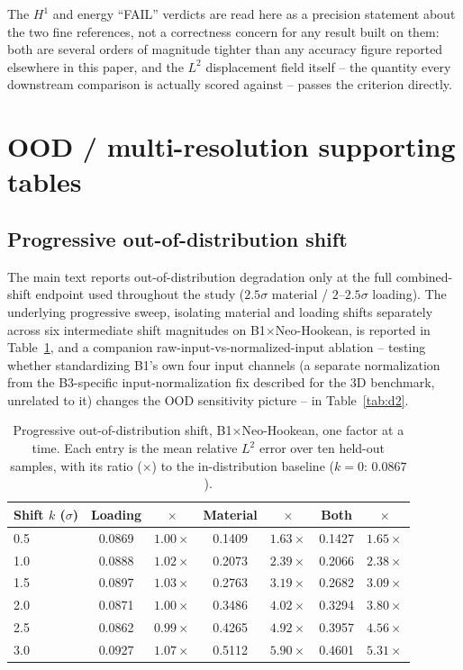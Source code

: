 \documentclass[final,5p,times]{elsarticle}
\begin{document}
The $H^1$ and energy ``FAIL'' verdicts are read here as a precision
statement about the two fine references, not a correctness concern for
any result built on them: both are several orders of magnitude tighter
than any accuracy figure reported elsewhere in this paper, and the $L^2$
displacement field itself -- the quantity every downstream comparison is
actually scored against -- passes the criterion directly.

\FloatBarrier
\section{OOD / multi-resolution supporting tables}
\label{app:d}
\setcounter{table}{0}

\subsection{Progressive out-of-distribution shift}
The main text reports out-of-distribution degradation
only at the full combined-shift endpoint used throughout the study
($2.5\sigma$ material / $2$--$2.5\sigma$ loading). The underlying
progressive sweep, isolating material and loading shifts separately
across six intermediate shift magnitudes on B1$\times$Neo-Hookean, is
reported in Table~\ref{tab:d1}, and a companion
raw-input-vs-normalized-input ablation -- testing whether standardizing
B1's own four input channels (a separate normalization from the
B3-specific input-normalization fix described for the 3D benchmark,
unrelated to it) changes the OOD sensitivity picture -- in
Table~\ref{tab:d2}.

\begin{table}[ht]
\centering
\caption{Progressive out-of-distribution shift, B1$\times$Neo-Hookean,
  one factor at a time. Each entry is the mean relative $L^2$ error over
  ten held-out samples, with its ratio ($\times$) to the in-distribution
  baseline ($k{=}0$: $0.0867$).}
\label{tab:d1}
\small
\begin{tabular}{lcccccc}
\toprule
Shift $k$ ($\sigma$) & Loading & $\times$ & Material & $\times$ & Both & $\times$ \\
\midrule
0.5 & 0.0869 & $1.00\times$ & 0.1409 & $1.63\times$ & 0.1427 & $1.65\times$ \\
1.0 & 0.0888 & $1.02\times$ & 0.2073 & $2.39\times$ & 0.2066 & $2.38\times$ \\
1.5 & 0.0897 & $1.03\times$ & 0.2763 & $3.19\times$ & 0.2682 & $3.09\times$ \\
2.0 & 0.0871 & $1.00\times$ & 0.3486 & $4.02\times$ & 0.3294 & $3.80\times$ \\
2.5 & 0.0862 & $0.99\times$ & 0.4265 & $4.92\times$ & 0.3957 & $4.56\times$ \\
3.0 & 0.0927 & $1.07\times$ & 0.5112 & $5.90\times$ & 0.4601 & $5.31\times$ \\
\bottomrule
\end{tabular}
\end{table}
\end{document}
